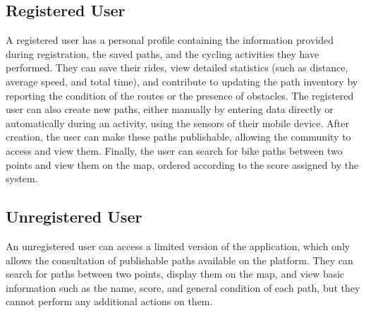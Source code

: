 \subsection{Registered User}
A registered user has a personal profile containing the information provided during registration, the saved paths, and the cycling activities they have performed.
They can save their rides, view detailed statistics (such as distance, average speed, and total time), and contribute to updating the path inventory by reporting the condition of the routes or the presence of obstacles.
The registered user can also create new paths, either manually by entering data directly or automatically during an activity, using the sensors of their mobile device.
After creation, the user can make these paths publishable, allowing the community to access and view them.
Finally, the user can search for bike paths between two points and view them on the map, ordered according to the score assigned by the system.

\subsection{Unregistered User}
An unregistered user can access a limited version of the application, which only allows the consultation of publishable paths available on the platform.
They can search for paths between two points, display them on the map, and view basic information such as the name, score, and general condition of each path, but they cannot perform any additional actions on them.
